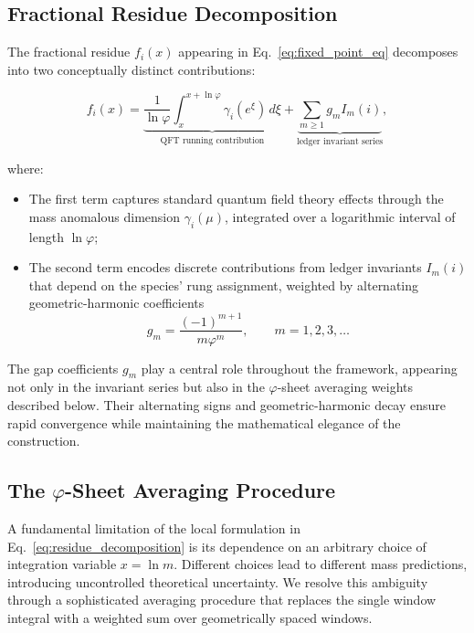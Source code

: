 \documentclass[%
amsmath,amssymb,
aps,
prb,
floatfix,
twocolumn
]{revtex4-2}
\begin{document}
\subsection{Fractional Residue Decomposition}

The fractional residue $f_i(x)$ appearing in Eq.~\eqref{eq:fixed_point_eq} decomposes into two conceptually distinct contributions:

\begin{equation}
f_i(x) = \underbrace{\frac{1}{\ln\varphi}\int_{x}^{x+\ln\varphi} \gamma_i(e^\xi) \, d\xi}_{\text{QFT running contribution}} + \underbrace{\sum_{m \geq 1} g_m I_m(i)}_{\text{ledger invariant series}},
\label{eq:residue_decomposition}
\end{equation}

where:

\begin{itemize}
\item The first term captures standard quantum field theory effects through the mass anomalous dimension $\gamma_i(\mu)$, integrated over a logarithmic interval of length $\ln \varphi$;

\item The second term encodes discrete contributions from ledger invariants $I_m(i)$ that depend on the species' rung assignment, weighted by alternating geometric-harmonic coefficients
\begin{equation}
g_m = \frac{(-1)^{m+1}}{m \varphi^m}, \qquad m = 1, 2, 3, \ldots
\label{eq:gap_coefficients}
\end{equation}
\end{itemize}

The gap coefficients $g_m$ play a central role throughout the framework, appearing not only in the invariant series but also in the $\varphi$-sheet averaging weights described below. Their alternating signs and geometric-harmonic decay ensure rapid convergence while maintaining the mathematical elegance of the construction.

\subsection{The $\varphi$-Sheet Averaging Procedure}
\label{subsec:phi-sheet}

A fundamental limitation of the local formulation in Eq.~\eqref{eq:residue_decomposition} is its dependence on an arbitrary choice of integration variable $x = \ln m$. Different choices lead to different mass predictions, introducing uncontrolled theoretical uncertainty. We resolve this ambiguity through a sophisticated averaging procedure that replaces the single window integral with a weighted sum over geometrically spaced windows.
\end{document}

